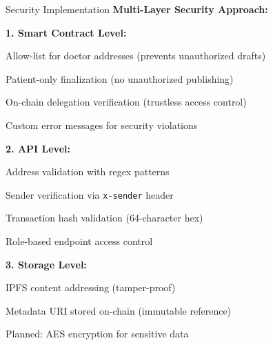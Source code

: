 \documentclass[10pt]{beamer}
\let\olditemize\itemize
\let\endolditemize\enditemize
\renewenvironment{itemize}
  {\olditemize\justifying}
  {\endolditemize}
\begin{document}
\begin{frame}{Security Implementation}
\textbf{Multi-Layer Security Approach:}

\textbf{1. Smart Contract Level:}
\begin{itemize}
\item Allow-list for doctor addresses (prevents unauthorized drafts)
\item Patient-only finalization (no unauthorized publishing)
\item On-chain delegation verification (trustless access control)
\item Custom error messages for security violations
\end{itemize}

\textbf{2. API Level:}
\begin{itemize}
\item Address validation with regex patterns
\item Sender verification via \texttt{x-sender} header
\item Transaction hash validation (64-character hex)
\item Role-based endpoint access control
\end{itemize}

\textbf{3. Storage Level:}
\begin{itemize}
\item IPFS content addressing (tamper-proof)
\item Metadata URI stored on-chain (immutable reference)
\item Planned: AES encryption for sensitive data
\end{itemize}
\end{frame}
\end{document}

